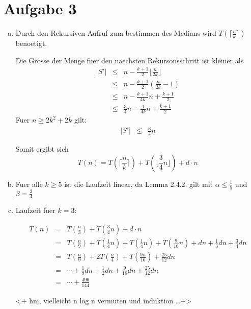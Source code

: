 \section*{Aufgabe 3}
\begin{enumerate}[(a)]
\item

Durch den Rekursiven Aufruf zum bestimmen des Medians wird $T(\lceil \frac{n}{k} \rceil)$ benoetigt.

Die Grosse der Menge fuer den naechsten Rekursonsschritt ist kleiner als 
\begin{eqnarray}
|S'| &\leq& n - \frac{k+1}{2} \lfloor \frac{n}{2 k} \rfloor \\
     &\leq& n - \frac{k+1}{2} \left( \frac{n}{2k}-1 \right) \\
     &\leq& n - \frac{k+1}{4k} n + \frac{k+1}{2} \\
     &\leq& \frac{3}{4}n - \frac{1}{4k} n + \frac{k+1}{2}
\end{eqnarray}
Fuer $n \geq 2k^2+2k$ gilt:
\begin{eqnarray}
     |S'| &\leq& \frac{3}{4}n
\end{eqnarray}

Somit ergibt sich 
\begin{equation}
T(n) = T\left( \lceil \frac{n}{k} \rceil \right) + T \left( \lfloor \frac{3}{4} n \rfloor  \right) + d \cdot n
\end{equation}

\item Fuer alle $k \geq 5$ ist die Laufzeit linear, da Lemma 2.4.2. gilt mit $\alpha \leq \frac{1}{5}$ und $\beta = \frac{3}{4}$ 

\item Laufzeit fuer $k=3$:

\begin{eqnarray}
T(n) &=& T\left( \frac{n}{3} \right) + T\left(\frac{3}{4} n\right) + d \cdot n \\
     &=& T\left( \frac{n}{9} \right) + T\left( \frac{1}{4} n \right) + T\left( \frac{1}{4}n \right) + T\left( \frac{9}{16}n \right) 
         + d n + \frac{1}{3} d n + \frac{3}{4} d n\\
     &=& T\left( \frac{n}{9} \right) + 2 T\left( \frac{n}{4} \right) + T\left( \frac{9n}{16} \right) 
         + \frac{25}{12} dn \\
     &=& 
         \cdots + \frac{1}{9} dn + \frac{1}{2} dn + \frac{9}{16} dn + \frac{25}{12} dn  \\
     &=& \cdots + \frac{496}{144}
\end{eqnarray}

<+ hm, vielleicht n log n vermuten und induktion \ldots +>


\end{enumerate}


